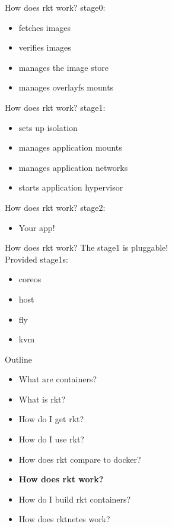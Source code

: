 \documentclass[pdf,aspectratio=169]{beamer}
\begin{document}
\begin{frame}{How does rkt work?}
    stage0:
    \begin{itemize}
        \item fetches images
        \item verifies images
        \item manages the image store
        \item manages overlayfs mounts
    \end{itemize}
\end{frame}

\begin{frame}{How does rkt work?}
    stage1:
    \begin{itemize}
        \item sets up isolation
        \item manages application mounts
        \item manages application networks
        \item starts application hypervisor
    \end{itemize}
\end{frame}

\begin{frame}{How does rkt work?}
    stage2:
    \begin{itemize}
        \item Your app!
    \end{itemize}
\end{frame}

\begin{frame}{How does rkt work?}
    The stage1 is pluggable! \\
    \pause
    \vspace{1em}
    Provided stage1s:
    \begin{itemize}
        \item coreos
        \item host
        \pause
        \item fly
        \pause
        \item kvm
    \end{itemize}
\end{frame}



\begin{frame}
    Outline
    \begin{itemize}
        \item What are containers?
        \item What is rkt?
        \item How do I get rkt?
        \item How do I use rkt?
        \item How does rkt compare to docker?
        \item \textbf{How does rkt work?}
        \item How do I build rkt containers?
        \item How does rktnetes work?
    \end{itemize}
\end{frame}
\end{document}
